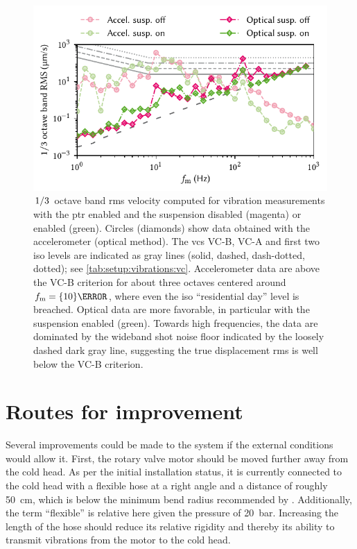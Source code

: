 \begin{figure}
    \centering
    \includegraphics{img/pdf/setup/vc}
    \caption[]{
        $\flatfrac{1}{3}$ octave band \gls{rms} velocity computed for vibration measurements with the \gls{ptr} enabled and the suspension disabled (magenta) or enabled (green).
        Circles (diamonds) show data obtained with the accelerometer (optical method).
        The \glspl{vc} VC-B, VC-A and first two \gls{iso} levels are indicated as gray lines (solid, dashed, dash-dotted, dotted); see \cref{tab:setup:vibrations:vc}.
        Accelerometer data are above the VC-B criterion for about three octaves centered around $f_{\mr{m}}=\qty{10}{\hertz}$, where even the \gls{iso} \enquote{residential day} level is breached.
        Optical data are more favorable, in particular with the suspension enabled (green).
        Towards high frequencies, the data are dominated by the wideband shot noise floor indicated by the loosely dashed dark gray line, suggesting the true displacement \gls{rms} is well below the VC-B criterion.
    }
    \label{fig:setup:vibrations:vc}
\end{figure}

\section{Routes for improvement}\label{sec:setup:vibrations:outlook}
Several improvements could be made to the system if the external conditions would allow it.
First, the rotary valve motor should be moved further away from the cold head.
As per the initial installation status, it is currently connected to the cold head with a flexible hose at a right angle and a distance of roughly \qty{50}{\cm}, which is below the minimum bend radius recommended by \oxinst.
Additionally, the term \enquote{flexible} is relative here given the pressure of \qty{20}{\bar}.
Increasing the length of the hose should reduce its relative rigidity and thereby its ability to transmit vibrations from the motor to the cold head.

